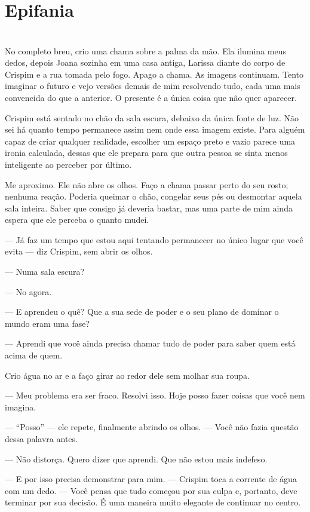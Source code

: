 \newpage
\ifdefined\useChapters
\chapter{Epifania}
\else
\chapter{}
\fi

No completo breu, crio uma chama sobre a palma da mão. Ela ilumina meus dedos, depois Joana sozinha em uma casa antiga, Larissa diante do corpo de Crispim e a rua tomada pelo fogo. Apago a chama. As imagens continuam. Tento imaginar o futuro e vejo versões demais de mim resolvendo tudo, cada uma mais convencida do que a anterior. O presente é a única coisa que não quer aparecer.

Crispim está sentado no chão da sala escura, debaixo da única fonte de luz. Não sei há quanto tempo permanece assim nem onde essa imagem existe. Para alguém capaz de criar qualquer realidade, escolher um espaço preto e vazio parece uma ironia calculada, dessas que ele prepara para que outra pessoa se sinta menos inteligente ao perceber por último.

Me aproximo. Ele não abre os olhos. Faço a chama passar perto do seu rosto; nenhuma reação. Poderia queimar o chão, congelar seus pés ou desmontar aquela sala inteira. Saber que consigo já deveria bastar, mas uma parte de mim ainda espera que ele perceba o quanto mudei.

— Já faz um tempo que estou aqui tentando permanecer no único lugar que você evita — diz Crispim, sem abrir os olhos.

— Numa sala escura?

— No agora.

— E aprendeu o quê? Que a sua sede de poder e o seu plano de dominar o mundo eram uma fase?

— Aprendi que você ainda precisa chamar tudo de poder para saber quem está acima de quem.

Crio água no ar e a faço girar ao redor dele sem molhar sua roupa.

— Meu problema era ser fraco. Resolvi isso. Hoje posso fazer coisas que você nem imagina.

— “Posso” — ele repete, finalmente abrindo os olhos. — Você não fazia questão dessa palavra antes.

— Não distorça. Quero dizer que aprendi. Que não estou mais indefeso.

— E por isso precisa demonstrar para mim. — Crispim toca a corrente de água com um dedo. — Você pensa que tudo começou por sua culpa e, portanto, deve terminar por sua decisão. É uma maneira muito elegante de continuar no centro.

